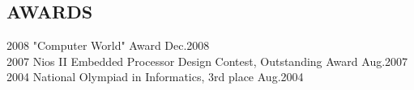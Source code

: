 \documentclass[11pt]{res} %
\begin{document}
\begin{resume}
\section{AWARDS}
2008 "Computer World" Award \hfill Dec.2008 \\
2007 Nios II Embedded Processor Design Contest, Outstanding Award \hfill Aug.2007 \\
2004 National Olympiad in Informatics, 3rd place \hfill Aug.2004

\end{resume}
\end{document}
